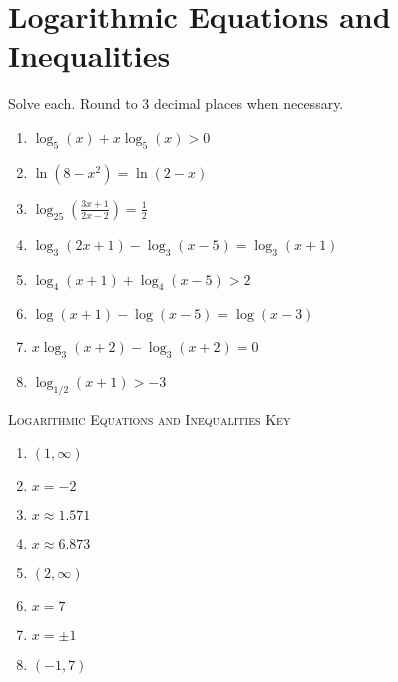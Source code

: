 \chapter{Logarithmic Equations and Inequalities}

Solve each. Round to 3 decimal places when necessary.
\begin{enumerate}
	\item $\log_5(x) + x\log_5(x) > 0$
	\item $\ln\left(8-x^2\right) = \ln(2-x)$
	\item $\log_{25}\left(\frac{3x+1}{2x-2}\right) = \frac{1}{2}$
	\item $\log_3(2x+1)-\log_3(x-5) = \log_3(x+1)$
	\item $\log_4(x+1) + \log_4(x-5) > 2$
	\item $\log(x+1) - \log(x-5) = \log(x-3)$
    \item $x\log_3(x+2)-\log_3(x+2)=0$
    \item $\log_{1/2}(x+1) > -3$
\end{enumerate}

\newpage

\textsc{Logarithmic Equations and Inequalities Key}

\begin{enumerate}
	\item $(1, \infty)$
	\item $x = -2$
	\item $x \approx 1.571$
	\item $x \approx 6.873$
	\item $(2, \infty)$
	\item $x = 7$
    \item $x = \pm 1$
    \item $(-1,7)$
\end{enumerate}
